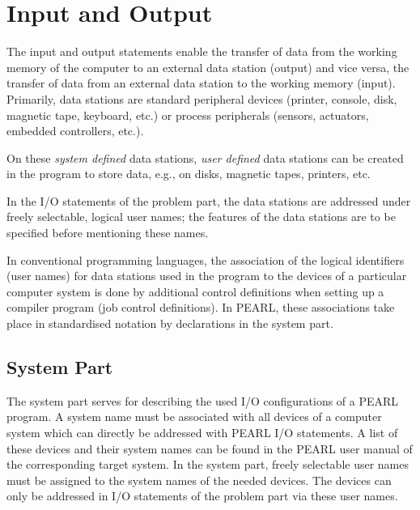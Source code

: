 
\chapter{Input and Output}   %
\label{sec_input_output}
The input and output statements enable the transfer of data from the
working memory of the computer to an external data station (output) and
vice versa, the transfer of data from an external data station to the
working memory (input). Primarily, data stations are standard peripheral
devices (printer, console, disk, magnetic tape, keyboard, etc.) or
process peripherals (sensors, actuators, embedded controllers, etc.).

On these {\em system defined} data stations, {\em user defined} data
stations can be created in the program to store data, e.g., on disks,
magnetic tapes, printers, etc.

In the I/O statements of the problem part, the data stations are
addressed under freely selectable, logical user names; the features of
the data stations are to be specified before mentioning these names.

In conventional programming languages, the association of the logical
identifiers (user names) for data stations used in the program to the
devices of a particular computer system is done by additional control
definitions when setting up a compiler program (job control
definitions). In PEARL, these associations take place in standardised
notation by declarations in the system part.

\section{System Part}    %
\label{dation_system_part}

The system part serves for describing the used I/O configurations of a
PEARL program. A system name must be associated with all devices of a
computer system which can directly be addressed with PEARL I/O
statements. A list of these devices and their system names can be
found in the PEARL user manual of the corresponding target system. In
the system part, freely selectable user names must be assigned to the
system names of the needed devices. The devices can only be addressed in
I/O statements of the problem part via these user names. 

\begin{grammarframe}

\end{grammarframe}

